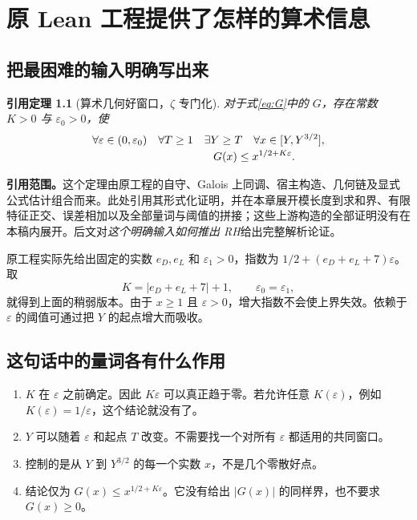 \documentclass[UTF8,fontset=fandol,a4paper,openany,oneside]{ctexbook}
\newtheorem{inputtheorem}[theorem]{引用定理}
\theoremstyle{definition}
\theoremstyle{remark}
\begin{document}

\chapter{原 Lean 工程提供了怎样的算术信息}
\label{chap:arithmetic}
\section{把最困难的输入明确写出来}
\begin{inputtheorem}[算术几何好窗口，$\zeta$ 专门化]
\label{thm:arithmetic}
对于式\eqref{eq:G}中的 $G$，存在常数 $K>0$ 与 $\varepsilon_0>0$，使
\begin{equation}
\begin{split}
&\forall\varepsilon\in(0,\varepsilon_0)\quad\forall T\ge1
\quad\exists Y\ge T\quad\forall x\in[Y,Y^{3/2}],\\[-2pt]
&\hspace{38mm}G(x)\le x^{1/2+K\varepsilon}.
\end{split}
\label{eq:arith-window}
\end{equation}
\end{inputtheorem}

\textbf{引用范围。}这个定理由原工程的自守、Galois 上同调、宿主构造、几何链及显式公式估计组合而来。此处引用其形式化证明，并在本章展开模长度到求和界、有限特征正交、误差相加以及全部量词与阈值的拼接；这些上游构造的全部证明没有在本稿内展开。后文对\emph{这个明确输入如何推出 RH}给出完整解析论证。

原工程实际先给出固定的实数 $e_D,e_L$ 和 $\varepsilon_1>0$，指数为
$1/2+(e_D+e_L+7)\varepsilon$。取
\[
K=|e_D+e_L+7|+1,\qquad \varepsilon_0=\varepsilon_1,
\]
就得到上面的稍弱版本。由于 $x\ge1$ 且 $\varepsilon>0$，增大指数不会使上界失效。依赖于 $\varepsilon$ 的阈值可通过把 $Y$ 的起点增大而吸收。

\section{这句话中的量词各有什么作用}
\begin{enumerate}
\item $K$ 在 $\varepsilon$ 之前确定。因此 $K\varepsilon$ 可以真正趋于零。若允许任意 $K(\varepsilon)$，例如 $K(\varepsilon)=1/\varepsilon$，这个结论就没有了。
\item $Y$ 可以随着 $\varepsilon$ 和起点 $T$ 改变。不需要找一个对所有 $\varepsilon$ 都适用的共同窗口。
\item 控制的是从 $Y$ 到 $Y^{3/2}$ 的每一个实数 $x$，不是几个零散好点。
\item 结论仅为 $G(x)\le x^{1/2+K\varepsilon}$。它没有给出 $|G(x)|$ 的同样界，也不要求 $G(x)\ge0$。
\end{enumerate}
\end{document}
